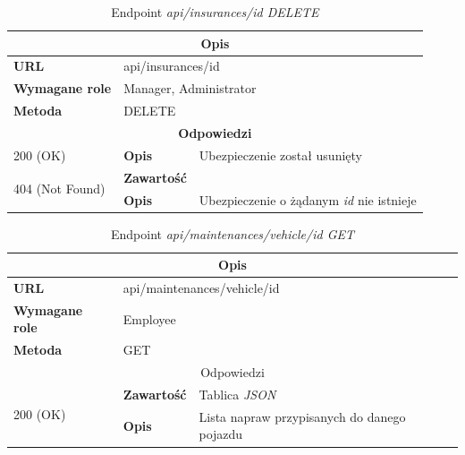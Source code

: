 \documentclass[eng,printmode,openany]{mgr}
\begin{document}
	\begin{table}[H]
		\caption{Endpoint \textit{api/insurances/id DELETE}}
		\begin{tabularx}{\textwidth}{|l|l|X|}
			\hline
			\multicolumn{3}{|c|}{\textbf{\textbf{Opis}}}
			\\ \hline
			\textbf{URL}                       & \multicolumn{2}{l|}{api/insurances/id}
			\\ \hline
			\textbf{Wymagane role}             & \multicolumn{2}{l|}{Manager, Administrator}
			\\ \hline
			\textbf{Metoda}                    & \multicolumn{2}{l|}{DELETE}
			\\ \hline
			\multicolumn{3}{|c|}{\textbf{Odpowiedzi}}
			\\ \hline
			200 (OK)			                & \textbf{Opis}         	& Ubezpieczenie został usunięty
			\\ \hline
			\multirow{2}{*}{404 (Not Found)} 	& \textbf{Zawartość}     & 
			\\ \cline{2-3}                      & \textbf{Opis}          & Ubezpieczenie o żądanym \textit{id} nie istnieje
			\\ \hline
		\end{tabularx}
	\end{table}
	
	\begin{table}[H]
		\caption{Endpoint \textit{api/maintenances/vehicle/id GET}}
		\begin{tabularx}{\textwidth}{|l|l|X|}
			\hline
			\multicolumn{3}{|c|}{\textbf{\textbf{Opis}}}
			\\ \hline
			\textbf{URL}                         & \multicolumn{2}{l|}{api/maintenances/vehicle/id}
			\\ \hline
			\textbf{Wymagane role}               & \multicolumn{2}{l|}{Employee}
			\\ \hline
			\textbf{Metoda}                      & \multicolumn{2}{l|}{GET}
			\\ \hline
			\multicolumn{3}{|c|}{ Odpowiedzi}
			\\ \hline
			\multirow{2}{*}{200 (OK)}   & \textbf{Zawartość}         & Tablica \textit{JSON}
			\\ \cline{2-3}              & \textbf{Opis}         	    & Lista napraw przypisanych do danego pojazdu
			\\ \hline
		\end{tabularx}
	\end{table}
	
\end{document}
